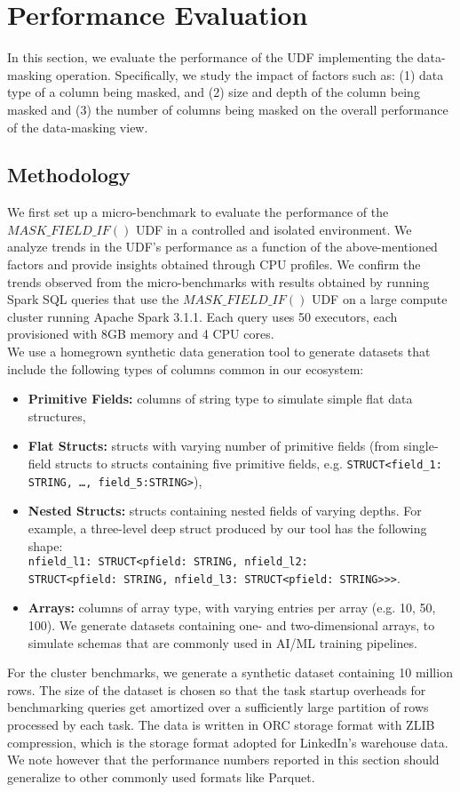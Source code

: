 \section{Performance Evaluation}
In this section, we evaluate the performance of the UDF implementing the data-masking operation. Specifically, we study the impact of factors such as: (1) data type of a column being masked, and (2) size and depth of the column being masked and (3) the number of columns being masked on the overall performance of the data-masking view. 

\subsection{Methodology}
We first set up a micro-benchmark to evaluate the performance of the $MASK\_FIELD\_IF()$ UDF in a controlled and isolated environment. We analyze trends in the UDF's performance as a function of the above-mentioned factors and provide insights obtained through CPU profiles. We confirm the trends observed from the micro-benchmarks with results obtained by running Spark SQL queries that use the $MASK\_FIELD\_IF()$ UDF on a large compute cluster running Apache Spark 3.1.1. Each query uses 50 executors, each provisioned with 8GB memory and 4 CPU cores. \\

We use a homegrown synthetic data generation tool to generate datasets that include the following types of columns common in our ecosystem:
\begin{itemize}
    \item {\bf Primitive Fields:} columns of string type to simulate simple flat data structures, 
    \item {\bf Flat Structs:} structs with varying number of primitive fields (from single-field structs to structs containing five primitive fields, e.g. \texttt{STRUCT<field\_1: STRING, \ldots, field\_5:STRING>}), 
    \item {\bf Nested Structs:} structs containing nested fields of varying depths. For example, a three-level deep struct produced by our tool has the following shape: \\
     \texttt{nfield\_l1: STRUCT<pfield: STRING, nfield\_l2: \\
     STRUCT<pfield: STRING, nfield\_l3: STRUCT<pfield: STRING>>>}.
    \item {\bf Arrays:} columns of array type, with varying entries per array (e.g. 10, 50, 100). We generate datasets containing one- and two-dimensional arrays, to simulate schemas that are commonly used in AI/ML training pipelines.
\end{itemize}
For the cluster benchmarks, we generate a synthetic dataset containing 10 million rows. The size of the dataset is chosen so that the task startup overheads for benchmarking queries get amortized over a sufficiently large partition of rows processed by each task. The data is written in ORC storage format with ZLIB compression, which is the storage format adopted for LinkedIn's warehouse data. We note however that the performance numbers reported in this section should generalize to other commonly used formats like Parquet. 

